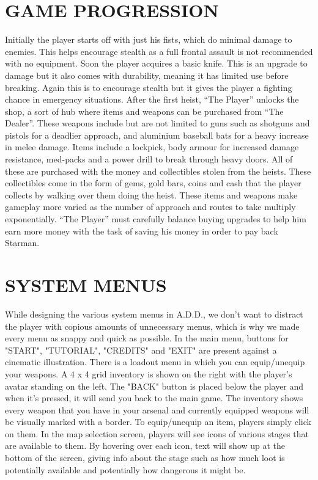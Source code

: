 \documentclass{article}
\begin{document}
\section{GAME PROGRESSION \label{progression}}
Initially the player starts off with just his fists, which do minimal damage to enemies. This helps encourage stealth as a full frontal assault is not recommended with no equipment. Soon the player acquires a basic knife. This is an upgrade to damage but it also comes with durability, meaning it has limited use before breaking. Again this is to encourage stealth but it gives the player a fighting chance in emergency situations.
\bigbreak
After the first heist, “The Player” unlocks the shop, a sort of hub where items and weapons can be purchased from “The Dealer”. These weapons include but are not limited to guns such as shotguns and pistols for a deadlier approach, and aluminium baseball bats for a heavy increase in melee damage.
\bigbreak
Items include a lockpick, body armour for increased damage resistance, med-packs and a power drill to break through heavy doors.
 \bigbreak
All of these are purchased with the money and collectibles stolen from the heists. These collectibles come in the form of gems, gold bars, coins and cash that the player collects by walking over them doing the heist.
\bigbreak
These items and weapons make gameplay more varied as the number of approach and routes to take multiply exponentially. “The Player” must carefully balance buying upgrades to help him earn more money with the task of saving his money in order to pay back Starman.

\section{SYSTEM MENUS \label{menus}}
While designing the various system menus in A.D.D., we don't want to distract the player with copious amounts of unnecessary menus, which is why we made every menu as snappy and quick as possible.
\bigbreak
In the main menu, buttons for "START", "TUTORIAL", "CREDITS" and "EXIT" are present against a cinematic illustration.
\bigbreak
There is a loadout menu in which you can equip/unequip your weapons. A 4 x 4 grid inventory is shown on the right with the player's avatar standing on the left. The "BACK" button is placed below the player and when it's pressed, it will send you back to the main game. The inventory shows every weapon that you have in your arsenal and currently equipped weapons will be visually marked with a border. To equip/unequip an item, players simply click on them.
\bigbreak
In the map selection screen, players will see icons of various stages that are available to them. By hovering over each icon, text will show up at the bottom of the screen, giving info about the stage such as how much loot is potentially available and potentially how dangerous it might be.
\end{document}
